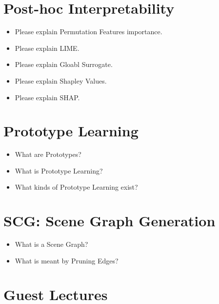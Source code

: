 \documentclass{report}
\begin{document}
\begin{itemize}
	\end{itemize}

	\section{Post-hoc Interpretability}
	
	\begin{itemize}
	\item Please explain Permutation Features importance.
	\newline 
	\item Please explain LIME.
	\newline 
	\item Please explain Gloabl Surrogate.
	\newline 
	
	\item Please explain Shapley Values.
	\newline 
	\item Please explain SHAP.
	\newline 
	
	\end{itemize}
	
	\section{Prototype Learning}
	
	\begin{itemize}
	\item What are Prototypes?
	\item What is Prototype Learning?
	\item What kinds of Prototype Learning exist?
	\end{itemize}
	
	\section{SCG: Scene Graph Generation}
	
	\begin{itemize}
	\item What is a Scene Graph?
	\item What is meant by Pruning Edges?
	\end{itemize}

	\section{Guest Lectures}
	
\end{document}
